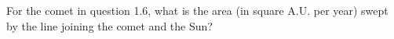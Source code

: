 For the comet in question 1.6, what is the area (in square A.U. per year) swept
by the line joining the comet and the Sun?
